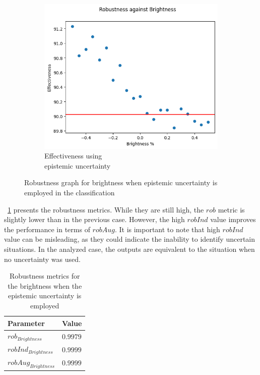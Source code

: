 \begin{figure}[h]
	\begin{subfigure}{.33\textwidth}
		\centering
		\includegraphics[width=0.9\linewidth]{ImageFiles/EvalBNN/BR/EU/eff}
		\caption{Effectiveness using \\ epistemic uncertainty}
		\label{fig:br_eu_eff}
	\end{subfigure}
	\caption{Robustness graph for brightness when epistemic uncertainty is employed in the classification}
	\label{fig:br_eu}
\end{figure}

\Tab~\ref{table:rob_br_eu} presents the robustness metrics. While they are still high, the $rob$ metric is slightly lower than in the previous case. However, the high $robInd$ value improves the performance in terms of $robAug$. It is important to note that high $robInd$ value can be misleading, as they could indicate the inability to identify uncertain situations. In the analyzed case, the outputs are equivalent to the situation when no uncertainty was used.

\begin{table}[h]
	\centering
	\begin{tabular}{|| l | l ||} 
		\hline
		\textbf{Parameter} & \textbf{Value} \\
		\hline
		\hline
		$rob_{Brightness}$ & $0.9979$ \\
		$robInd_{Brightness}$ & $0.9999$ \\
		$robAug_{Brightness}$ & $0.9999$ \\	
		\hline
	\end{tabular}	
	\caption{Robustness metrics for the brightness when the epistemic uncertainty is employed}
	\label{table:rob_br_eu}
\end{table}

